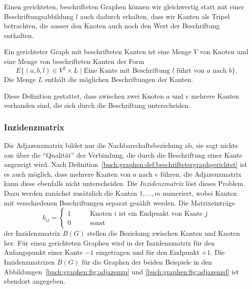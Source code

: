 Einen gerichteten, beschrifteten Graphen können wir gleichwertig
statt mit einer Beschriftungsabbildung $l$ auch dadurch erhalten,
dass wir Kanten als Tripel betrachten, die ausser den Knoten auch
noch den Wert der Beschriftung enthalten.

\begin{definition}
\label{buch:graphen:def:beschriftetergraphgerichtet}
Ein gerichteter Graph mit beschrifteten Kanten ist eine Menge $V$ von 
Knoten und eine Menge von beschrifteten Kanten der Form
\[
E \{ (a,b,l)\in V^2\times L\;|\; \text{Eine Kante mit Beschriftung $l$ führt von $a$ nach $b$}\}.
\]
Die Menge $L$ enthält die möglichen Beschriftungen der Kanten.
\end{definition}

Diese Definition gestattet, dass zwischen zwei Knoten $a$ und $e$
mehrere Kanten vorhanden sind, die sich durch die Beschriftung
unterscheiden.

\subsubsection{Inzidenzmatrix}
Die Adjazenzmatrix bildet nur die Nachbarschaftsbeziehung ab,
sie sagt nichts aus über die ``Qualität'' der Verbindung, die durch
die Beschriftung einer Kante angezeigt wird.
Nach Definition~\ref{buch:graphen:def:beschriftetergraphgerichtet}
ist es auch möglich, dass mehrere Kanten von $a$ nach $e$ führen,
die Adjazenzmatrix kann diese ebenfalls nicht unterscheiden.
Die {\em Inzidenzmatrix}
löst dieses Problem.
%
Dazu werden zunächst zusätzlich die Kanten $1,\dots,m$
numeriert, wobei Kanten mit verschiedenen Beschriftungen separat
gezählt werden.
Die Matrixeinträge
\[
b_{i\!j} = \begin{cases}
1\qquad&\text{Knoten $i$ ist ein Endpunkt von Kante $j$}
\\
0\qquad&\text{sonst}
\end{cases}
\]
der Inzidenzmatrix $B(G)$
stellen die Beziehung zwischen Kanten und Knoten her.
Für einen gerichteten Graphen wird in der Inzidenzmatrix für
den Anfangspunkt einer Kante $-1$ eingetragen und für den
Endpunkt $+1$.
Die Inzidenzmatrizen $B(G)$ für die Graphen der beiden Beispiele
in den Abbildungen~\ref{buch:graphen:fig:adjazenzu} und
\ref{buch:graphen:fig:adjazenzd} ist ebendort angegeben.


